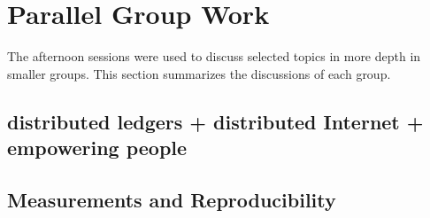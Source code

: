 \section{Parallel Group Work}\label{sec:parallel-group-work}

The afternoon sessions were used to discuss selected topics in more depth in
smaller groups. This section summarizes the discussions of each group.


\subsection{distributed ledgers + distributed Internet + empowering people}

\subsection{Measurements and Reproducibility}





